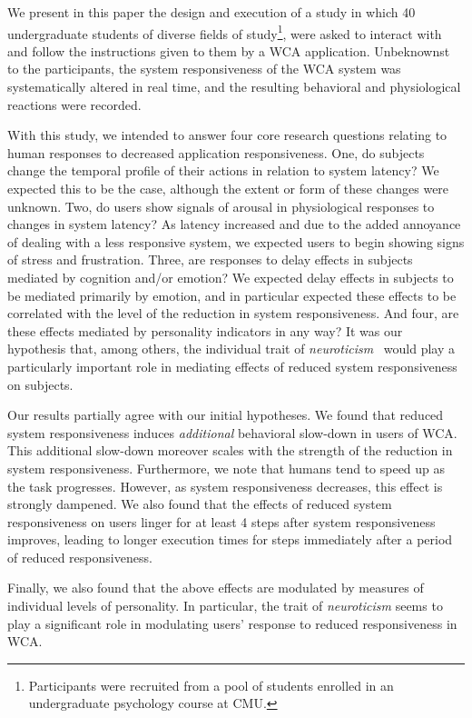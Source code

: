 We present in this paper the design and execution of a study in which \num{40} undergraduate students of diverse fields of
study\footnote{%
    Participants were recruited from a pool of students enrolled in an undergraduate psychology course at \gls{CMU}.
}, were asked to interact with and follow the instructions given to them by a \gls{WCA} application.
Unbeknownst to the participants, the system responsiveness of the \gls{WCA} system was systematically altered in real time, and the resulting behavioral and physiological reactions were recorded.

With this study, we intended to answer four core research questions relating to human responses to decreased application responsiveness.
One, do subjects change the temporal profile of their actions in relation to system latency?
We expected this to be the case, although the extent or form of these changes were unknown.
Two, do users show signals of arousal in physiological responses to changes in system latency?
As latency increased and due to the added annoyance of dealing with a less responsive system, we expected users to begin showing signs of stress and frustration.
Three, are responses to delay effects in subjects mediated by cognition and/or emotion?
We expected delay effects in subjects to be mediated primarily by emotion, and in particular expected these effects to be correlated with the level of the reduction in system responsiveness.
And four, are these effects mediated by personality indicators in any way?
It was our hypothesis that, among others, the individual trait of \emph{neuroticism}~\cite{john1999big} would play a particularly important role in mediating effects of reduced system responsiveness on subjects.

Our results partially agree with our initial hypotheses.
We found that reduced system responsiveness induces \emph{additional} behavioral slow-down in users of \gls{WCA}.
This additional slow-down moreover scales with the strength of the reduction in system responsiveness.
Furthermore, we note that humans tend to speed up as the task progresses.
However, as system responsiveness decreases, this effect is strongly dampened.
We also found that the effects of reduced system responsiveness on users linger for at least \num{4} steps after system responsiveness improves, leading to longer execution times for steps immediately after a period of reduced responsiveness.

Finally, we also found that the above effects are modulated by measures of individual levels of personality.
In particular, the trait of \emph{neuroticism} seems to play a significant role in modulating users' response to reduced responsiveness in \gls{WCA}.


